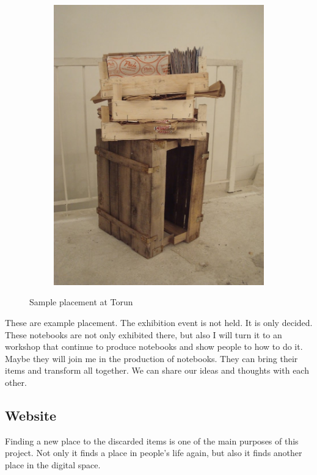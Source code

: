 \begin{figure}
\begin{subfigure}[b]{0.48\textwidth}
    \includegraphics[width=\textwidth]{project_graphics/torun2.jpg}
  \end{subfigure}
  \caption{Sample placement at Torun}
  \label{fig:SamplePlacementAtTorun}
\end{figure}

These are example placement. The exhibition event is not held. It is only decided. These notebooks are not only exhibited there, but also I will turn it to an workshop that continue to produce notebooks and show people to how to do it. Maybe they will join me in the production of notebooks. They can bring their items and transform all together. We can share our ideas and thoughts with each other. 





%
%
\subsection{Website}
Finding a new place to the discarded items is one of the main purposes of this project. Not only it finds a place in people's life again, but also it finds another place in the digital space.

